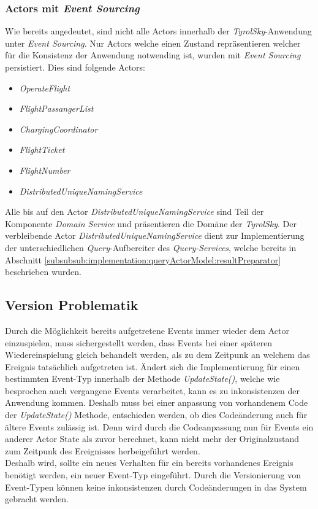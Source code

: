 \subsubsection{Actors mit \textit{Event Sourcing}}
Wie bereits angedeutet, sind nicht alle Actors innerhalb der \textit{TyrolSky}-Anwendung unter \textit{Event Sourcing}. Nur Actors welche einen Zustand repräsentieren welcher für die Konsistenz der Anwendung notwending ist, wurden mit \textit{Event Sourcing} persistiert. Dies sind folgende Actors: 
\begin{itemize}
    \item{\textit{OperateFlight}}
    \item{\textit{FlightPassangerList}}
    \item{\textit{ChargingCoordinator}}
    \item{\textit{FlightTicket}}
    \item{\textit{FlightNumber}}
    \item{\textit{DistributedUniqueNamingService}}
\end{itemize}
Alle bis auf den Actor \textit{DistributedUniqueNamingService} sind Teil der Komponente \textit{Domain Service} und präsentieren die Domäne der \textit{TyrolSky}. Der verbleibende Actor \textit{DistributedUniqueNamingService} dient zur Implementierung der unterschiedlichen \textit{Query}-Aufbereiter des \textit{Query-Services}, welche bereits in Abschnitt \ref{subsubsub:implementation:queryActorModel:resultPreparator} beschrieben wurden.

\subsection{Version Problematik}
Durch die Möglichkeit bereits aufgetretene Events immer wieder dem Actor einzuspielen, muss sichergestellt werden, dass Events bei einer späteren Wiedereinspielung gleich behandelt werden, als zu dem Zeitpunk an welchem das Ereignis tatsächlich aufgetreten ist. Ändert sich die Implementierung für einen bestimmten Event-Typ innerhalb der Methode \textit{UpdateState()}, welche wie besprochen auch vergangene Events verarbeitet, kann es zu inkonsistenzen der Anwendung kommen. Deshalb muss bei einer anpassung von vorhandenem Code der \textit{UpdateState()} Methode, entschieden werden, ob dies Codeänderung auch für ältere Events zulässig ist. Denn wird durch die Codeanpassung nun für Events ein anderer Actor State als zuvor berechnet, kann nicht mehr der Originalzustand zum Zeitpunk des Ereignisses herbeigeführt werden. \\
Deshalb wird, sollte ein neues Verhalten für ein bereits vorhandenes Ereignis benötigt werden, ein neuer Event-Typ eingeführt. Durch die Versionierung von Event-Typen können keine inkonsistenzen durch Codeänderungen in das System gebracht werden. 

